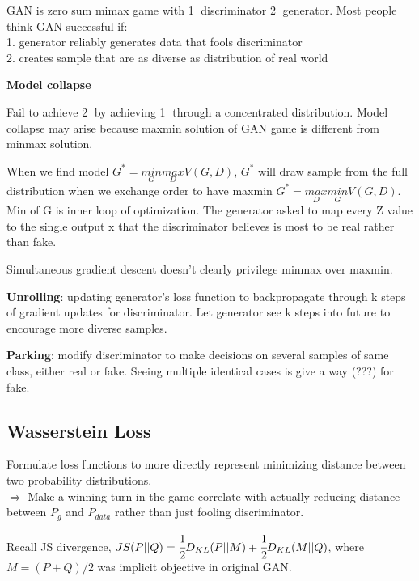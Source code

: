 \documentclass[12pt,a4paper]{article}
\begin{document}
GAN is zero sum mimax game with \textcircled{1} discriminator \textcircled{2} generator. Most people think GAN successful if:\\
1. generator reliably generates data that fools discriminator\\
2. creates sample that are as diverse as distribution of real world



\textbf{Model collapse}

Fail to achieve \textcircled{2} by achieving \textcircled{1} through a concentrated distribution. Model collapse may arise because maxmin solution of GAN game is different from minmax solution. 

When we find model $G^*=\underset{G}{min}\underset{D}{max} V(G,D)$, $G^*$ will draw sample from the full distribution when we exchange order to have maxmin $G^*=\underset{D}{max}\underset{G}{min} V(G,D)$.
Min of G is inner loop of optimization. The generator asked to map every Z value to the single output x that the discriminator believes is most to be real rather than fake. 

Simultaneous gradient descent doesn't clearly privilege minmax over maxmin. 

\textbf{Unrolling}: updating generator's loss function to backpropagate through k steps of gradient updates for discriminator. Let generator see k steps into future to encourage more diverse samples. 

\textbf{Parking}: modify discriminator to make decisions on several samples of same class, either real or fake. Seeing multiple identical cases is give a way (???) for fake.


\subsection{Wasserstein Loss}
Formulate loss functions to more directly represent minimizing distance between two probability distributions.\\
$\Rightarrow$ Make a winning turn in the game correlate with actually reducing distance between $P_g$ and $P_{data}$ rather than just fooling discriminator. 

Recall JS divergence, $JS(P||Q)=\cfrac{1}{2}D_{KL}(P||M)+\cfrac{1}{2}D_{KL}(M||Q)$, where $M=(P+Q)/2$ was implicit objective in original GAN. 
\end{document}
